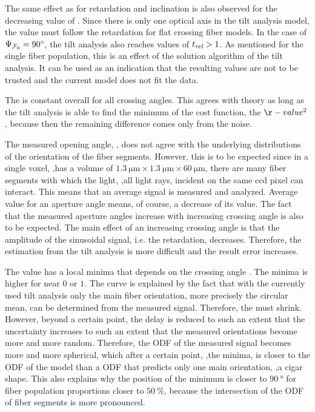 \par
%
The same effect as for retardation and inclination is also observed for the decreasing value of \trel{}.
Since there is only one optical axis in the tilt analysis model, the \trel{} value must follow the retardation for flat crossing fiber models.
In the case of $\textnormal{$\Psi_{\textnormal{$\mathcal{F}_0$}}$}=\SI{90}{\degree}$, the tilt analysis also reaches values of $\textnormal{$t_\mathit{rel}$}>1$.
As mentioned for the single fiber population, this is an effect of the solution algorithm of the tilt analysis.
It can be used as an indication that the resulting values are not to be trusted and the current model does not fit the data.
\par
% 
The \rvalue{} is constant overall for all crossing angles.
This agrees with theory as long as the tilt analysis is able to find the minimum of the cost function, the $\r-value^2$, because then the remaining difference comes only from the noise.
\par
%
The measured opening angle, \openingAngle{}, does not agree with the underlying distributions of the orientation of the fiber segments.
However, this is to be expected since in a single voxel, \ie{},has a volume of $\SI{1.3}{\micro\meter} \times \SI{1.3}{\micro\meter} \times \SI{60}{\micro\meter}$, there are many fiber segments with which the light, \ie{},all light rays, incident on the same ccd pixel can interact.
This means that an average signal is measured and analyzed.
Average value for an aperture angle means, of course, a decrease of its value.
The fact that the measured aperture angles increase with increasing crossing angle is also to be expected.
The main effect of an increasing crossing angle is that the amplitude of the sinusoidal signal, i.e. the retardation, decreases.
Therefore, the estimation from the tilt analysis is more difficult and the result error increases.
% 
\par
The \accvalue{} value has a local minima that depends on the crossing angle \modelOmega{}.
The minima is higher for \modelPsi{} near $0$ or $1$.
The curve is explained by the fact that with the currently used tilt analysis only the main fiber orientation, more precisely the circular mean, can be determined from the measured signal.
Therefore, the \accvalue{} must shrink.
However, beyond a certain point, the delay is reduced to such an extent that the uncertainty increases to such an extent that the measured orientations become more and more random.
Therefore, the \ac{ODF} of the measured signal becomes more and more spherical, which after a certain point, \ie{},the minima, is closer to the \ac{ODF} of the model than a \ac{ODF} that predicts only one main orientation, \ie{},a cigar shape.
This also explains why the position of the minimum is closer to $\SI{90}{\degree}$ for fiber population proportions closer to $\SI{50}{\percent}$, because the intersection of the \ac{ODF} of fiber segments is more pronounced.
% 
